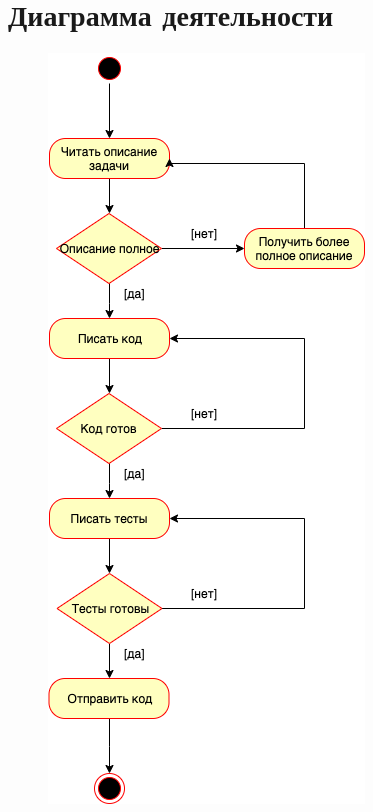 \section{Диаграмма деятельности}

\begin{figure}[H]
	\centering
	\includegraphics[scale=0.9]{img/activity-uml}
\end{figure}
